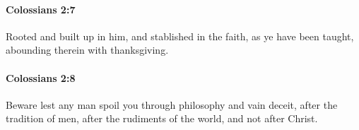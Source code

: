 		\paragraph{Colossians 2:7} %
			\label{COLOSSIANS-2-7}

			Rooted and built up in him, and stablished in the faith, as ye have been taught, abounding therein with thanksgiving.

			\begin{framed}
		\scriptsize
				\begin{compactdesc}
					\item[SBLG] 
				\end{compactdesc}
			\end{framed}

		\paragraph{Colossians 2:8} %
			\label{COLOSSIANS-2-8}

			Beware lest any man spoil you through philosophy and vain deceit, after the tradition of men, after the rudiments of the world, and not after Christ.

